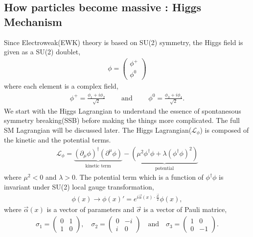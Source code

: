 \subsection{How particles become massive : Higgs Mechanism}
Since Electroweak(EWK) theory is based on SU(2) symmetry, the Higgs field is 
given as a SU(2) doublet, 
\begin{eqnarray} 
\phi = \left(  \begin{array}{c} \phi^+ \\ \phi^0 \end{array} \right)
\end{eqnarray} 
where each element is a complex field, 
\begin{eqnarray} 
\phi^+ = \frac{\phi_1 + i\phi_2}{\sqrt{2}} 
\qquad \textrm{ and } \qquad  
\phi^0 = \frac{\phi_3 + i\phi_4}{\sqrt{2}}.
\end{eqnarray} 
We start with the Higgs Lagrangian to understand the essence of 
spontanesous symmetry breaking(SSB) before making the things more 
complicated. The full SM Lagrangian will be discussed later.  
The Higgs Lagrangian($\mathcal{L}_\phi$) is composed of the kinetic 
and the potential terms. 
\begin{eqnarray}
\label{eq:lagHiggs}
\mathcal{L}_\phi 
=
\underbrace{
    \left( \partial_\mu \phi \right)^\dagger \left( \partial^\mu \phi \right)
}_\text{kinetic term} 
- 
\underbrace{
    \left( \mu^2 \phi^\dagger \phi + \lambda \left( \phi^\dagger \phi \right)^2 \right)
}_\text{potential} 
\end{eqnarray} 
where $\mu^2<0$ and $\lambda>0$.
The potential term which is a function of $ \phi^\dagger \phi$ is invariant under 
SU(2) local gauge transformation, 
\begin{eqnarray} 
\phi(x) 
\rightarrow 
\phi(x)' = e^{i \vec{\alpha}(x) \cdot \frac{\vec{\sigma}}{2}} \phi(x),
\end{eqnarray} 
where $\vec{\alpha}(x)$ is a vector of parameters and  
$\vec{\sigma}$ is a vector of Pauli matrice,  
\begin{align*}
\sigma_1 = \begin{pmatrix} 0 & 1\\
                            1 & 0
            \end{pmatrix}, 
\quad 
\sigma_2 = \begin{pmatrix} 0 & -i\\
                            i & 0
            \end{pmatrix}
\quad 
\textrm{and} 
\quad 
\sigma_3 = \begin{pmatrix} 1 & 0\\
                            0 & -1
            \end{pmatrix}.
\end{align*}
